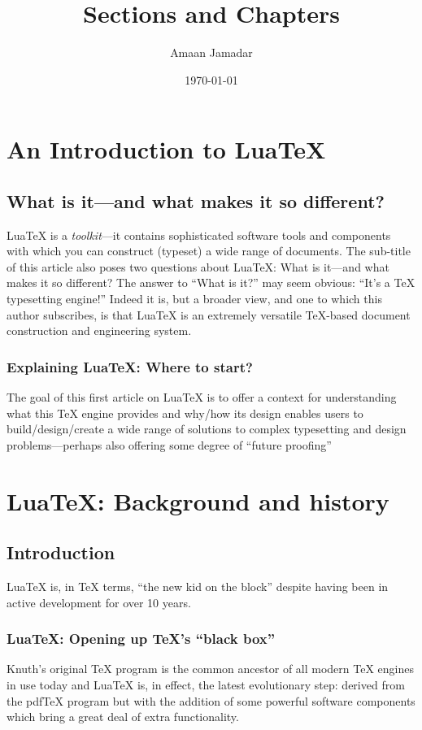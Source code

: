 \documentclass{report}
\title{Sections and Chapters}
\author{Amaan Jamadar}
\date{\today}
\begin{document}
\maketitle
\tableofcontents
\chapter{An Introduction to Lua\TeX}

\section{What is it—and what makes it so different?}
Lua\TeX{} is a \textit{toolkit}—it contains sophisticated software tools and components with which you can construct (typeset) a wide range of documents. The sub-title of this article also poses two questions about Lua\TeX: What is it—and what makes it so different? The answer to “What is it?” may seem obvious: “It’s a \TeX{} typesetting engine!” Indeed it is, but a broader view, and one to which this author subscribes, is that Lua\TeX{} is an extremely versatile \TeX-based document construction and engineering system.

\subsection{Explaining Lua\TeX: Where to start?}
The goal of this first article on Lua\TeX{} is to offer a context for understanding what this TeX engine provides and why/how its design enables users to build/design/create a wide range of solutions to complex typesetting and design problems—perhaps also offering some degree of “future proofing” 

\chapter{Lua\TeX: Background and history}
\section{Introduction}
Lua\TeX{} is, in \TeX{} terms, “the new kid on the block” despite having been in active development for over 10 years.

\subsection{Lua\TeX: Opening up \TeX’s “black box”}
Knuth’s original \TeX{} program is the common ancestor of all modern \TeX{} engines in use today and Lua\TeX{} is, in effect, the latest evolutionary step: derived from the pdf\TeX{} program but with the addition of some powerful software components which bring a great deal of extra functionality.
\end{document}
